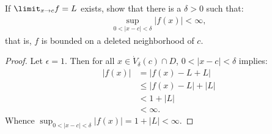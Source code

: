 \documentclass[11pt,twoside,openany]{memoir}
\begin{document}
    \begin{exercise}
        If $\limit_{x \rightarrow c}f = L$ exists, show that there is a $\delta > 0$ such that:
            \begin{equation*}
            \begin{split}
                \sup_{0 < |x-c| < \delta}|f(x)| < \infty,
            \end{split}
            \end{equation*}
        that is, $f$ is bounded on a deleted neighborhood of $c$.
    \end{exercise}
        \begin{proof}
            Let $\epsilon = 1$. Then for all $x \in \dot{V}_\delta(c) \cap D$, $0 < |x-c| < \delta$ implies:
                \begin{equation*}
                \begin{split}
                    |f(x)|
                    & = |f(x) - L + L| \\
                    & \leq |f(x) - L| + |L| \\
                    & < 1 + |L| \\
                    & < \infty.
                \end{split}
                \end{equation*}
            Whence $\sup_{0 < |x-c| < \delta}|f(x)| = 1 + |L| < \infty$.
        \end{proof}
\end{document}
